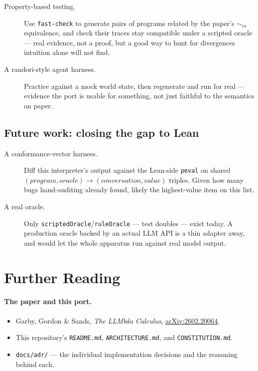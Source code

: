 \documentclass[11pt, a4paper]{article}
\begin{document}
\begin{descirption}
{\begin{description}
  \item[Property-based testing.] Use \texttt{fast-check} to generate
    pairs of programs related by the paper's $\sim_m$ equivalence, and
    check their traces stay compatible under a scripted oracle --- real
    evidence, not a proof, but a good way to hunt for divergences
    intuition alone will not find.
  \item[A randori-style agent harness.] Practice against a mock world
    state, then regenerate and run for real --- evidence the port is
    usable for something, not just faithful to the semantics on paper.
\end{description}

\subsection{Future work: closing the gap to Lean}

\begin{description}
  \item[A conformance-vector harness.] Diff this interpreter's output
    against the Lean-side \texttt{peval} on shared $(\mathit{program},
    \mathit{oracle}) \to (\mathit{conversation}, \mathit{value})$ triples.
    Given how many bugs hand-auditing already found, likely the
    highest-value item on this list.
  \item[A real oracle.] Only \lstinline{scriptedOracle}/\lstinline{ruleOracle}
    --- test doubles --- exist today. A production oracle backed by an
    actual LLM API is a thin adapter away, and would let the whole
    apparatus run against real model output.
\end{description}

\section*{Further Reading}

\paragraph{The paper and this port.}
\begin{itemize}
  \item Garby, Gordon \& Sands, \emph{The LLMbda Calculus},
    \href{https://arxiv.org/abs/2602.20064}{arXiv:2602.20064}.
  \item This repository's \texttt{README.md}, \texttt{ARCHITECTURE.md},
    and \texttt{CONSTITUTION.md}.
  \item \texttt{docs/adr/} --- the individual implementation decisions
    and the reasoning behind each.
\end{itemize}

}
\end{descirption}
\end{document}
